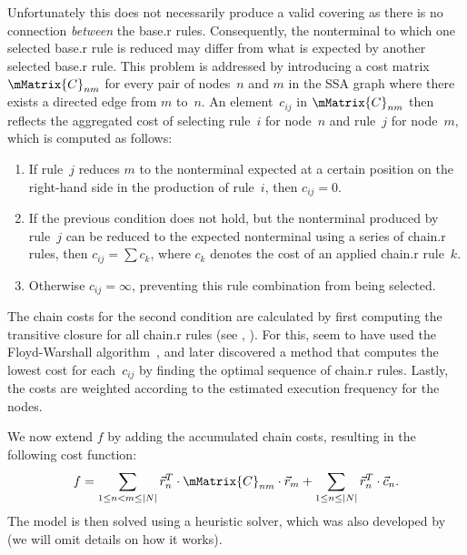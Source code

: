 Unfortunately this does not necessarily produce a valid covering as there is no
connection \emph{between} the \gls{base.r} \glspl{rule}.
%
Consequently, the
\gls{nonterminal} to which one selected \gls{base.r} \gls{rule} is reduced may differ
from what is expected by another selected \gls{base.r} \gls{rule}.
%
This problem is
addressed by introducing a cost matrix~$\mMatrix{C}_{nm}$ for every pair of
\glspl{node}~$n$ and $m$ in the \gls{SSA graph} where there exists a directed
\gls{edge} from $m$ to~$n$.
%
An element~$c_{ij}$ in $\mMatrix{C}_{nm}$ then
reflects the aggregated cost of selecting rule~$i$ for \gls{node}~$n$ and
rule~$j$ for \gls{node}~$m$, which is computed as follows:
\begin{enumerate}
  \item If rule~$j$ reduces $m$ to the \gls{nonterminal} expected at a certain
    position on the right-hand side in the \gls{production} of rule~$i$, then
    \mbox{$c_{ij} = 0$}.
  \item If the previous condition does not hold, but the \gls{nonterminal}
    produced by rule~$j$ can be reduced to the expected \gls{nonterminal} using
    a series of \gls{chain.r} \glspl{rule}, then \mbox{$c_{ij} = \sum c_k$}, where $c_k$
    denotes the cost of an applied \gls{chain.r} \gls{rule}~$k$.
  \item Otherwise \mbox{$c_{ij} = \infty$}, preventing this rule combination
    from being selected.
\end{enumerate}
The chain costs for the second condition are calculated by first computing the
\gls{transitive closure} for all \gls{chain.r} \glspl{rule} (see
, ).
%
For this,
\citeauthor{Eckstein2003} seem to have used the Floyd-Warshall
algorithm~\cite{Floyd1962}, and \textcite{Schaefer2007} later discovered a
method that computes the lowest cost for each~$c_{ij}$ by finding the optimal
sequence of \gls{chain.r} \glspl{rule}.
%
Lastly, the costs are weighted according to the
estimated execution frequency for the \glspl{node}.

We now extend $f$ by adding the accumulated chain costs, resulting in the
following cost function:
\begin{displaymath}
  f =
  \sum_{1 \leq n < m \leq |N|}
    \mVector{r}_n^T \cdot \mMatrix{C}_{nm} \cdot \mVector{r}_m
  +
  \sum_{1 \leq n \leq |N|} \mVector{r}_n^T \cdot \mVector{c}_n.
\end{displaymath}
The model is then solved using a heuristic  solver, which
was also developed by \citeauthor{Eckstein2003} (we will omit details on how it
works).

